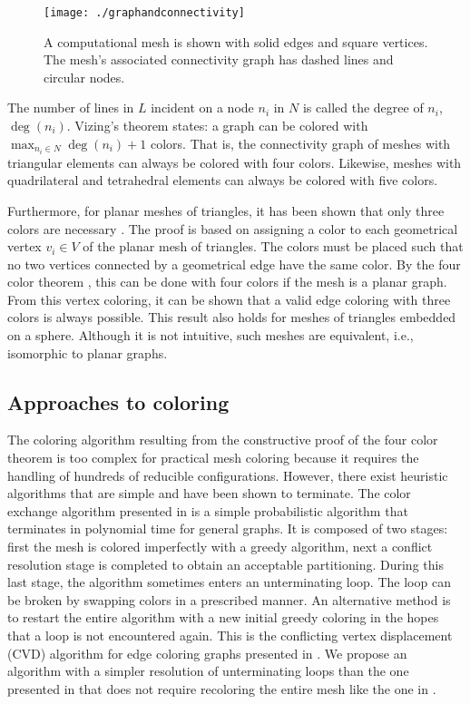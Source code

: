 \documentclass[12pt]{article}
\begin{document}
\begin{figure}
\centering
\texttt{[image: ./graphandconnectivity]}
\caption{A computational mesh is shown with solid edges and square vertices. The mesh's associated connectivity graph has dashed lines and circular nodes.}
\label{fig:graphandconnectivity}
\end{figure}


The number of lines in $L$ incident on a node $n_i$ in $N$ is called the degree of $n_i$, $\deg(n_i)$.  Vizing's theorem \cite{vizing} states: a graph can be colored with $\max_{n_i \in N} \deg(n_i) + 1$ colors.  That is, the connectivity graph of meshes with triangular elements can always be colored with four colors.  Likewise, meshes with quadrilateral and tetrahedral elements can always be colored with five colors.

Furthermore, for planar meshes of triangles, it has been shown that only three colors are necessary \cite{wilson1996introduction}.  The proof is based on assigning a color to each geometrical vertex $v_i \in V$ of the planar mesh of triangles.  The colors must be placed such that no two vertices connected by a geometrical edge have the same color.  By the four color theorem \cite{appel}, this can be done with four colors if the mesh is a planar graph.  From this vertex coloring, it can be shown that a valid edge coloring with three colors is always possible.  This result also holds for meshes of triangles embedded on a sphere.  Although it is not intuitive, such meshes are equivalent, i.e., isomorphic to planar graphs.



\subsection{Approaches to coloring}
The coloring algorithm resulting from the constructive proof of the four color theorem \cite{appel} is too complex for practical mesh coloring because it requires the handling of hundreds of reducible configurations.  However, there exist heuristic algorithms that are simple and have been shown to terminate.  The color exchange algorithm presented in \cite{complexcolors} is a simple probabilistic algorithm that terminates in polynomial time for general graphs.  It is composed of two stages: first the mesh is colored imperfectly with a greedy algorithm, next a conflict resolution stage is completed to obtain an acceptable partitioning.  During this last stage, the algorithm sometimes enters an unterminating loop.  The loop can be broken by swapping colors in a prescribed manner.  An alternative method is to restart the entire algorithm with a new initial greedy coloring in the hopes that a loop is not encountered again.  This is the conflicting vertex displacement (CVD) algorithm for edge coloring graphs presented in \cite{fiol2012}.  We propose an algorithm with a simpler resolution of unterminating loops than the one presented in \cite{complexcolors} that does not require recoloring the entire mesh like the one in \cite{fiol2012}.
\end{document}
